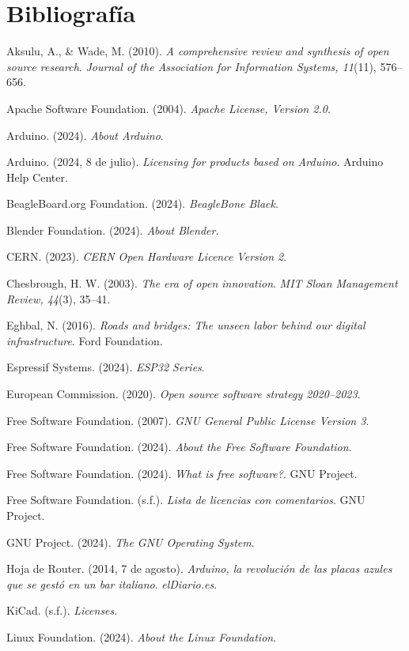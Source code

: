 \documentclass[12pt]{article}
\begin{document}
	
	\section*{Bibliografía}
	
	Aksulu, A., \& Wade, M. (2010). \textit{A comprehensive review and synthesis of open source research}. \textit{Journal of the Association for Information Systems, 11}(11), 576--656.
	
	Apache Software Foundation. (2004). \textit{Apache License, Version 2.0}.
	
	Arduino. (2024). \textit{About Arduino}.
	
	Arduino. (2024, 8 de julio). \textit{Licensing for products based on Arduino}. Arduino Help Center.
	
	BeagleBoard.org Foundation. (2024). \textit{BeagleBone Black}.
	
	Blender Foundation. (2024). \textit{About Blender}.
	
	CERN. (2023). \textit{CERN Open Hardware Licence Version 2}.
	
	Chesbrough, H. W. (2003). \textit{The era of open innovation}. \textit{MIT Sloan Management Review, 44}(3), 35--41.
	
	Eghbal, N. (2016). \textit{Roads and bridges: The unseen labor behind our digital infrastructure}. Ford Foundation.
	
	Espressif Systems. (2024). \textit{ESP32 Series}.
	
	European Commission. (2020). \textit{Open source software strategy 2020--2023}.
	
	Free Software Foundation. (2007). \textit{GNU General Public License Version 3}.
	
	Free Software Foundation. (2024). \textit{About the Free Software Foundation}.
	
	Free Software Foundation. (2024). \textit{What is free software?}. GNU Project.
	
	Free Software Foundation. (s.f.). \textit{Lista de licencias con comentarios}. GNU Project.
	
	GNU Project. (2024). \textit{The GNU Operating System}.
	
	Hoja de Router. (2014, 7 de agosto). \textit{Arduino, la revolución de las placas azules que se gestó en un bar italiano}. \textit{elDiario.es}.
	
	KiCad. (s.f.). \textit{Licenses}.
	
	Linux Foundation. (2024). \textit{About the Linux Foundation}.
	
\end{document}
